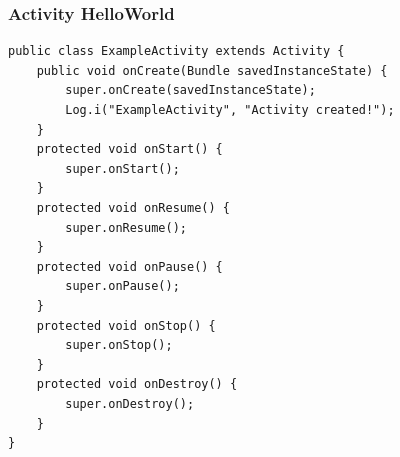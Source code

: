 \begin{frame}[fragile]
  \frametitle{Activity HelloWorld}
\begin{verbatim}
public class ExampleActivity extends Activity {
    public void onCreate(Bundle savedInstanceState) {
        super.onCreate(savedInstanceState);
        Log.i("ExampleActivity", "Activity created!");
    }
    protected void onStart() {
        super.onStart();
    }
    protected void onResume() {
        super.onResume();
    }
    protected void onPause() {
        super.onPause();
    }
    protected void onStop() {
        super.onStop();
    }
    protected void onDestroy() {
        super.onDestroy();
    }
}
\end{verbatim}
\end{frame}
